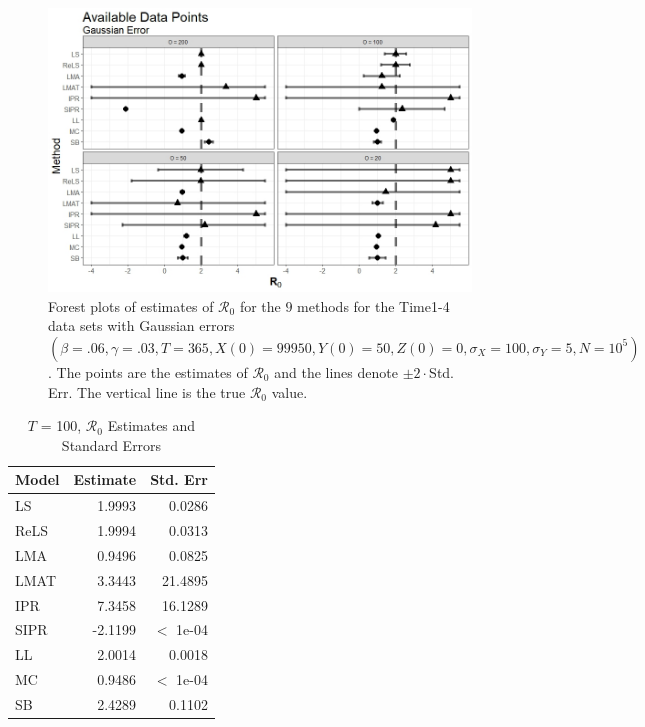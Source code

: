 \documentclass[12pt]{article}
\newcommand{\xxsir}{\ensuremath{9} } %
\newcommand{\rr}{\ensuremath{\mathcal{R}_0}}
\begin{document}
\begin{figure}[H]
  \centering
  \includegraphics[scale=0.5]{images/time_n.jpeg}
  \caption{Forest plots of estimates of $\rr$ for the \xxsir methods for the Time1-4 data sets with Gaussian errors $(\beta=.06, \gamma=.03, T=365, X(0)=99950, Y(0)=50, Z(0)=0, \sigma_X=100, \sigma_Y=5, N=10^5)$.  The points are the estimates of $\rr$ and the lines denote $\pm 2\cdot $Std. Err.  The vertical line is the true $\rr$ value.}\label{fig:time-res}
  \end{figure}


\begin{table}[H]
	

	\centering
	\begin{tabular}[t]{l|r|r}
		\hline
		Model & Estimate & Std. Err\\
		\hline
		LS & 1.9993 & 0.0286\\
		\hline
		ReLS & 1.9994 & 0.0313\\
		\hline
		LMA & 0.9496 & 0.0825\\
		\hline
		LMAT & 3.3443 & 21.4895\\
		\hline
		IPR & 7.3458 & 16.1289\\
		\hline
		SIPR & -2.1199 & $<$ 1e-04\\
		\hline
		LL & 2.0014 & 0.0018\\
		\hline
		MC & 0.9486 & $<$ 1e-04\\
		\hline
		SB & 2.4289 & 0.1102\\
		\hline
	\end{tabular}
        \caption{ $T$ = 100, $\rr$ Estimates and Standard Errors}\label{tab:time-res1}
\end{table}
\end{document}
